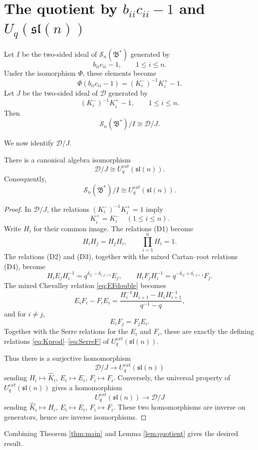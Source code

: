 \documentclass[11pt]{article}
\newcommand{\cS}{\mathcal S}
\newcommand{\slq}{\mathfrak{sl}(n)}
\newcommand{\Uq}{U_q}
\begin{document}
\section{The quotient by \(b_{ii}c_{ii}-1\) and \(U_q(\slq)\)}

Let \(I\) be the two-sided ideal of \(\cS_n(\mathfrak B^*)\) generated by
\[
b_{ii}c_{ii}-1,\qquad 1\le i\le n.
\]
Under the isomorphism \(\Phi\), these elements become
\[
\Phi(b_{ii}c_{ii}-1)=(K_i^-)^{-1}K_i^+-1.
\]
Let \(J\) be the two-sided ideal of \(\mathcal D\) generated by
\[
(K_i^-)^{-1}K_i^+-1,\qquad 1\le i\le n.
\]
Then
\[
\cS_n(\mathfrak B^*)/I\cong \mathcal D/J.
\]

We now identify \(\mathcal D/J\).

\begin{lemma}\label{lem:quotient}
There is a canonical algebra isomorphism
\[
\mathcal D/J\cong \Uq^{ext}(\slq).
\]
Consequently,
\[
\cS_n(\mathfrak B^*)/I\cong \Uq^{ext}(\slq).
\]
\end{lemma}

\begin{proof}
In \(\mathcal D/J\), the relations \((K_i^-)^{-1}K_i^+=1\) imply
\[
K_i^+=K_i^-\quad(1\le i\le n).
\]
Write \(H_i\) for their common image.  The relations (D1) become
\[
H_iH_j=H_jH_i,\qquad \prod_{i=1}^n H_i=1.
\]
The relations (D2) and (D3), together with the mixed Cartan--root relations (D4), become
\[
H_iE_jH_i^{-1}=q^{\delta_{ij}-\delta_{i,j+1}}E_j,
\qquad
H_iF_jH_i^{-1}=q^{-\delta_{ij}+\delta_{i,j+1}}F_j.
\]
The mixed Chevalley relation \eqref{eq:EFdouble} becomes
\[
E_iF_i-F_iE_i
=
\frac{H_i^{-1}H_{i+1}-H_iH_{i+1}^{-1}}{q^{-1}-q},
\]
and for \(i\neq j\),
\[
E_iF_j=F_jE_i.
\]
Together with the Serre relations for the \(E_i\) and \(F_i\), these are exactly the defining relations \eqref{eq:Kprod}--\eqref{eq:SerreF} of \(\Uq^{ext}(\slq)\).

Thus there is a surjective homomorphism
\[
\mathcal D/J\longrightarrow \Uq^{ext}(\slq)
\]
sending \(H_i\mapsto \widehat K_i\), \(E_i\mapsto E_i\), \(F_i\mapsto F_i\).  Conversely, the universal property of \(\Uq^{ext}(\slq)\) gives a homomorphism
\[
\Uq^{ext}(\slq)\longrightarrow \mathcal D/J
\]
sending \(\widehat K_i\mapsto H_i\), \(E_i\mapsto E_i\), \(F_i\mapsto F_i\).  These two homomorphisms are inverse on generators, hence are inverse isomorphisms.
\end{proof}

Combining Theorem \ref{thm:main} and Lemma \ref{lem:quotient} gives the desired result.
\end{document}
